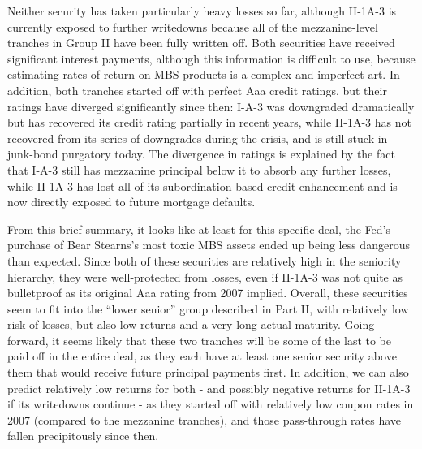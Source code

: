 \documentclass[12pt]{article}
\begin{document}
Neither security has taken particularly heavy losses so far, although II-1A-3 is currently exposed to further writedowns because all of the mezzanine-level tranches in Group II have been fully written off. Both securities have received significant interest payments, although this information is difficult to use, because estimating rates of return on MBS products is a complex and imperfect art. In addition, both tranches started off with perfect Aaa credit ratings, but their ratings have diverged significantly since then: I-A-3 was downgraded dramatically but has recovered its credit rating partially in recent years, while II-1A-3 has not recovered from its series of downgrades during the crisis, and is still stuck in junk-bond purgatory today. The divergence in ratings is explained by the fact that I-A-3 still has mezzanine principal below it to absorb any further losses, while II-1A-3 has lost all of its subordination-based credit enhancement and is now directly exposed to future mortgage defaults.

From this brief summary, it looks like at least for this specific deal, the Fed’s purchase of Bear Stearns’s most toxic MBS assets ended up being less dangerous than expected. Since both of these securities are relatively high in the seniority hierarchy, they were well-protected from losses, even if II-1A-3 was not quite as bulletproof as its original Aaa rating from 2007 implied. Overall, these securities seem to fit into the “lower senior” group described in Part II, with relatively low risk of losses, but also low returns and a very long actual maturity. Going forward, it seems likely that these two tranches will be some of the last to be paid off in the entire deal, as they each have at least one senior security above them that would receive future principal payments first. In addition, we can also predict relatively low returns for both - and possibly negative returns for II-1A-3 if its writedowns continue - as they started off with relatively low coupon rates in 2007 (compared to the mezzanine tranches), and those pass-through rates have fallen precipitously since then.
\end{document}
